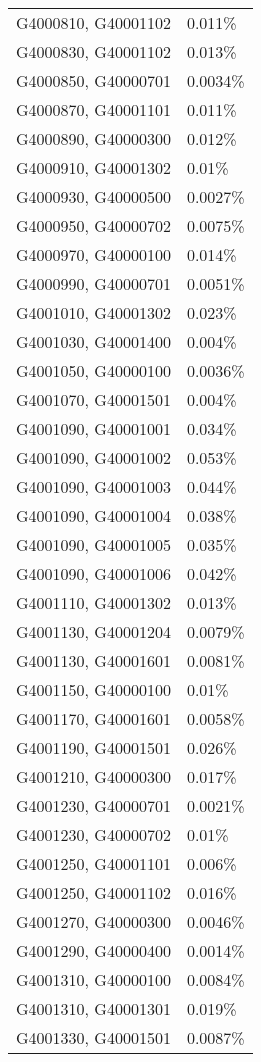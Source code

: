 \begin{longtable}[]{@{}ll@{}}
G4000810, G40001102 & 0.011\% \\
G4000830, G40001102 & 0.013\% \\
G4000850, G40000701 & 0.0034\% \\
G4000870, G40001101 & 0.011\% \\
G4000890, G40000300 & 0.012\% \\
G4000910, G40001302 & 0.01\% \\
G4000930, G40000500 & 0.0027\% \\
G4000950, G40000702 & 0.0075\% \\
G4000970, G40000100 & 0.014\% \\
G4000990, G40000701 & 0.0051\% \\
G4001010, G40001302 & 0.023\% \\
G4001030, G40001400 & 0.004\% \\
G4001050, G40000100 & 0.0036\% \\
G4001070, G40001501 & 0.004\% \\
G4001090, G40001001 & 0.034\% \\
G4001090, G40001002 & 0.053\% \\
G4001090, G40001003 & 0.044\% \\
G4001090, G40001004 & 0.038\% \\
G4001090, G40001005 & 0.035\% \\
G4001090, G40001006 & 0.042\% \\
G4001110, G40001302 & 0.013\% \\
G4001130, G40001204 & 0.0079\% \\
G4001130, G40001601 & 0.0081\% \\
G4001150, G40000100 & 0.01\% \\
G4001170, G40001601 & 0.0058\% \\
G4001190, G40001501 & 0.026\% \\
G4001210, G40000300 & 0.017\% \\
G4001230, G40000701 & 0.0021\% \\
G4001230, G40000702 & 0.01\% \\
G4001250, G40001101 & 0.006\% \\
G4001250, G40001102 & 0.016\% \\
G4001270, G40000300 & 0.0046\% \\
G4001290, G40000400 & 0.0014\% \\
G4001310, G40000100 & 0.0084\% \\
G4001310, G40001301 & 0.019\% \\
G4001330, G40001501 & 0.0087\% \\

\end{longtable}
